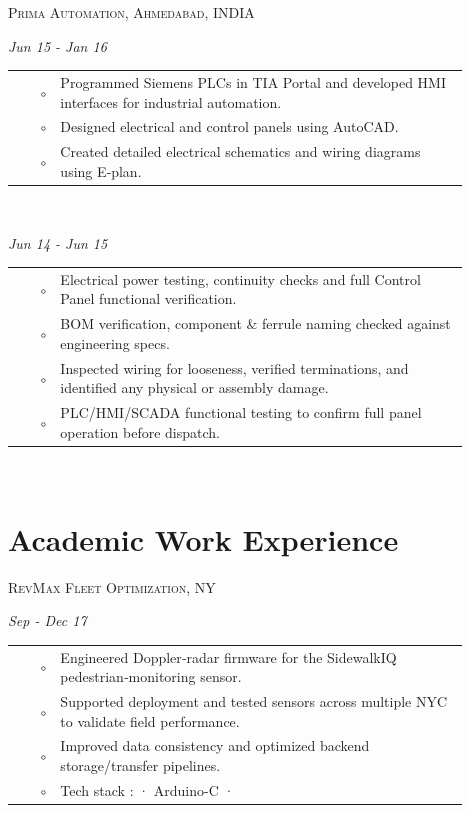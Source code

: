 \documentclass[a4paper]{article}
\newcommand{\SectionSize}{\Large}
\newcommand{\PreviousWorkBullet}[1]{
  \noindent\hspace*{2.0em}$\circ$ & {\fontspec{Inter} #1} \\
}
\begin{document}
{\color{previousCompany}
\noindent
\parbox[c][2em][c]{\linewidth}{   %
{\Large\faBriefcase\; \textsc{Prima Automation, Ahmedabad, INDIA}}}
{\color{previousRole}
\noindent{}
\hfill \emph{Jun 15 - Jan 16}
{\color{previousWork}
\begin{tabular}{r p{0.9\linewidth}}
\PreviousWorkBullet{ Programmed Siemens PLCs in TIA Portal and developed HMI interfaces for industrial automation.	}
\PreviousWorkBullet{ Designed electrical and control panels using AutoCAD.											}
\PreviousWorkBullet{ Created detailed electrical schematics and wiring diagrams using E‑plan.						}
\end{tabular}\\
}

{\color{previousRole}
\noindent{}
\hfill \emph{Jun 14 - Jun 15}
}
{\color{previousWork}
\begin{tabular}{r p{0.9\linewidth}}
\PreviousWorkBullet{ Electrical power testing, continuity checks and full Control Panel functional verification.			}
\PreviousWorkBullet{ BOM verification, component \& ferrule naming checked against engineering specs.						}
\PreviousWorkBullet{ Inspected wiring for looseness, verified terminations, and identified any physical or assembly damage.	}
\PreviousWorkBullet{ PLC/HMI/SCADA functional testing to confirm full panel operation before dispatch.						}
\end{tabular}\\
}

\newpage

\vspace{0em} %
\section{\SectionSize\textbf{Academic Work Experience}}

\noindent
\parbox[c][2em][c]{\linewidth}{   %
{\color{previousCompany}
{\Large \faBriefcase\; \textsc{RevMax Fleet Optimization, NY}}}
}
{\color{previousRole}
\noindent{}
\hfill \emph{Sep - Dec 17}
}
{\color{previousWork}
\begin{tabular}{r p{0.9\linewidth}}
\PreviousWorkBullet{ Engineered Doppler‑radar firmware for the SidewalkIQ pedestrian‑monitoring sensor.			}
\PreviousWorkBullet{ Supported deployment and tested sensors across multiple NYC to validate field performance.	}
\PreviousWorkBullet{ Improved data consistency and optimized backend storage/transfer pipelines.				}
\PreviousWorkBullet{ Tech stack : · Arduino-C ·																	}
\end{tabular}\\
}

}}
\end{document}
